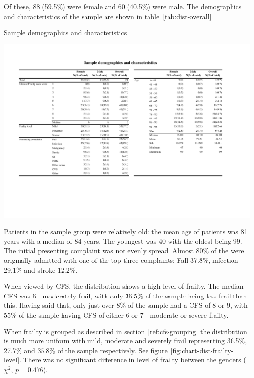 \documentclass
[
	12pt,
	a4paper,
	oneside,
]{report}
\begin{document}
Of these, 88 (59.5\%) were female and 60 (40.5\%) were male. The demographics 
and characteristics of the sample are shown in table~\ref{tab:dist-overall}.

\begin{table}[p]
\caption{Sample demographics and characteristics}
\label{tab:dist-overall}
\includegraphics[width=\textwidth,
	trim={1.5cm 4cm 2.5cm 2cm},
	clip,
	angle=90,
	scale=1.45]{media/dist-overall}
\end{table}

Patients in the sample group were relatively old: the mean age of patients was 
81 years with a median of 84 years. The youngest was 40 with the oldest being 
99. 
The initial presenting complaint was not evenly spread. Almost 80\% of the
were originally admitted with one of the top three complaints: Fall 37.8\%, 
infection 29.1\% and stroke 12.2\%. 

When viewed by CFS, the distribution shows a high level of frailty. The median 
CFS was 6 - moderately frail, with only 36.5\% of the sample being less frail
than this. Having said that, only just over 8\% of the sample had a CFS of 8
or 9, with 55\% of the sample having CFS of either 6 or 7 - moderate or
severe frailty. 

When frailty is grouped as described in section~\ref{ref:cfs-grouping} the 
distribution is much more uniform with mild, moderate and severely frail
representing 36.5\%, 27.7\% and 35.8\% of the sample respectively.
See figure~\ref{fig:chart-dist-frailty-level}. There was no significant 
difference in level of frailty between the genders ($\chi^2$, $p=0.476$).
\label{sec:results-dist}
\end{document}
